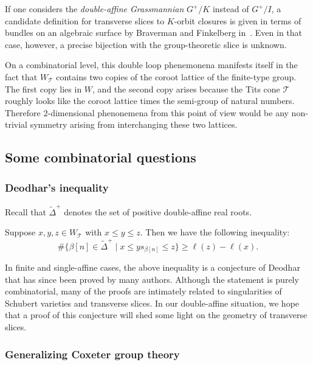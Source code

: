 \documentclass[ALCO,ThmDefs,Unicode]{cedram}
\newcommand{\cT}{\mathcal{T}}
\newcommand{\suchthat}{\mid}
\newcommand{\WTits}{W_{\TitsCone}}
\newcommand{\TitsCone}{\cT}
\newcommand{\tDelta}{\widetilde{\Delta}}
\begin{document}
If one considers the \emph{double-affine Grassmannian} $G^+/K$ instead of $G^+/I$, a candidate definition for transverse slices to $K$-orbit closures is given in terms of bundles on an algebraic surface by Braverman and Finkelberg in~\cite{BF}. Even in that case, however, a precise bijection with the group-theoretic slice is unknown.

On a combinatorial level, this double loop phenemonena manifests itself in the fact that $\WTits$ contains two copies of the coroot lattice of the finite-type group. The first copy lies in $W$, and the second copy arises because the Tits cone $\cT$ roughly looks like the coroot lattice times the semi-group of natural numbers. Therefore $2$-dimensional phenonemena from this point of view would be any non-trivial symmetry arising from interchanging these two lattices.

\subsection{Some combinatorial questions}

\subsubsection{Deodhar's inequality}

Recall that $\tDelta^+$ denotes the set of positive double-affine real roots.

\begin{conj}
Suppose $x,y,z \in \WTits$ with $x \leq y \leq z$. Then we have the following inequality:
\begin{equation}\label{eq:30}
\# \{ \beta[n] \in \tDelta^+ \suchthat x \leq y s_{\beta[n]} \leq z \} \geq \ell(z) - \ell(x).
\end{equation}
\end{conj}

In finite and single-affine cases, the above inequality is a conjecture of Deodhar that has since been proved by many authors. Although the statement is purely combinatorial, many of the proofs are intimately related to singularities of Schubert varieties and transverse slices. In our double-affine situation, we hope that a proof of this conjecture will shed some light on the geometry of transverse slices.

\subsubsection{Generalizing Coxeter group theory}
\end{document}
